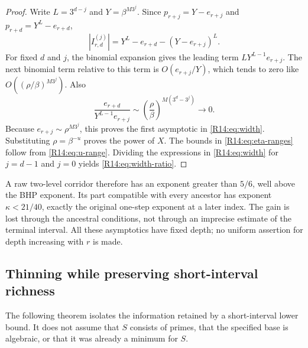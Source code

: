 \documentclass[11pt,a4paper]{article}
\theoremstyle{definition}\newtheorem{definition}[theorem]{Definition}
\theoremstyle{remark}\newtheorem{remark}[theorem]{Remark}
\begin{document}
\begin{proof}
Write $L=3^{d-j}$ and $Y=\beta^{M3^j}$. Since
$p_{r+j}=Y-e_{r+j}$ and $p_{r+d}=Y^L-e_{r+d}$,
\[
 |I_{r,d}^{(j)}|
 =Y^L-e_{r+d}-(Y-e_{r+j})^L.
\]
For fixed $d$ and $j$, the binomial expansion gives the leading
term $LY^{L-1}e_{r+j}$. The next binomial term relative to this
term is $O(e_{r+j}/Y)$, which tends to zero like
$O((\rho/\beta)^{M3^j})$. Also
\[
 \frac{e_{r+d}}{Y^{L-1}e_{r+j}}
 \sim\left(\frac\rho\beta\right)^{M(3^d-3^j)}
 \longrightarrow0.
\]
Because $e_{r+j}\sim\rho^{M3^j}$, this proves the first
asymptotic in \eqref{R14:eq:width}. Substituting $\rho=\beta^{-u}$
proves the power of $X$. The bounds in \eqref{R14:eq:eta-ranges}
follow from \eqref{R14:eq:u-range}. Dividing the expressions in
\eqref{R14:eq:width} for $j=d-1$ and $j=0$ yields
\eqref{R14:eq:width-ratio}.
\end{proof}

A raw two-level corridor therefore has an exponent greater than
$5/6$, well above the BHP exponent. Its part compatible with every
ancestor has exponent $\kappa<21/40$, exactly the original
one-step exponent at a later index. The gain is lost through the
ancestral conditions, not through an imprecise estimate of the
terminal interval. All these asymptotics have fixed depth; no
uniform assertion for depth increasing with $r$ is made.

\subsection{Thinning while preserving short-interval richness}

The following theorem isolates the information retained by a
short-interval lower bound. It does not assume that $S$ consists
of primes, that the specified base is algebraic, or that it was
already a minimum for $S$.
\end{document}
